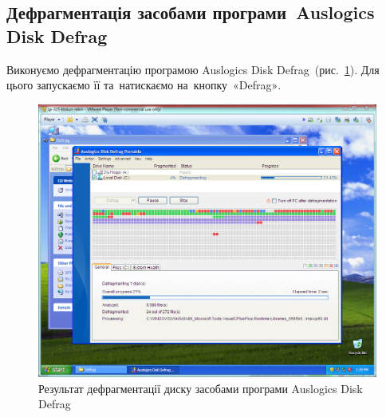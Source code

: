 \documentclass[
	a4paper,
	oneside,
	DIV = 12,
	fontsize = 13pt,
	headings = normal,
]{scrartcl}
\begin{document}
		\subsection{Дефрагментація засобами програми~\textenglish{Auslogics Disk Defrag}}
			Виконуємо дефрагментацію програмою \textenglish{Auslogics Disk Defrag}~(рис.~\ref{fig:04-auslogics-defrag}). Для цього запускаємо її та~натискаємо на~кнопку~\textenglish{«Defrag»}.
			\begin{figure}[!htbp]
				\centering
				\includegraphics[height = 8\baselineskip]{./assets/lab-02-05.png}
				\caption{Результат дефрагментації диску засобами програми \textenglish{Auslogics Disk Defrag}}
				\label{fig:04-auslogics-defrag}
			\end{figure}
\end{document}
